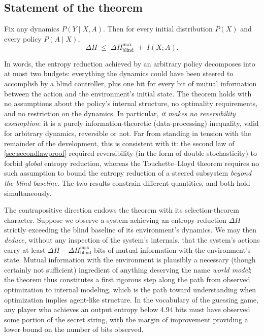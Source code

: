 \documentclass[11pt]{article}
\begin{document}
\subsection{Statement of the theorem}
\label{sec:tlthm}

\begin{theorem}
\label{thm:tl}
Fix any dynamics $P(Y \mid X, A)$. Then for every initial distribution $P(X)$ and every policy $P(A \mid X)$,
\[
\Delta H \;\le\; \Delta H^{\max}_{\mathrm{blind}} \;+\; I(X; A).
\]
\end{theorem}

In words, the entropy reduction achieved by an arbitrary policy decomposes into at most two budgets: everything the dynamics could have been steered to accomplish by a blind controller, plus one bit for every bit of mutual information between the action and the environment's initial state. The theorem holds with no assumptions about the policy's internal structure, no optimality requirements, and no restriction on the dynamics. In particular, \emph{it makes no reversibility assumption}: it is a purely information-theoretic (data-processing) inequality, valid for arbitrary dynamics, reversible or not. Far from standing in tension with the remainder of the development, this is consistent with it: the second law of \cref{sec:secondlawproof} required reversibility (in the form of double stochasticity) to forbid \emph{global} entropy reduction, whereas the Touchette--Lloyd theorem requires no such assumption to bound the entropy reduction of a steered subsystem \emph{beyond the blind baseline}. The two results constrain different quantities, and both hold simultaneously.

The contrapositive direction endows the theorem with its selection-theorem character. Suppose we observe a system achieving an entropy reduction $\Delta H$ strictly exceeding the blind baseline of its environment's dynamics. We may then \emph{deduce}, without any inspection of the system's internals, that the system's actions carry at least $\Delta H - \Delta H^{\max}_{\text{blind}}$ bits of mutual information with the environment's state. Mutual information with the environment is plausibly a necessary (though certainly not sufficient) ingredient of anything deserving the name \emph{world model}; the theorem thus constitutes a first rigorous step along the path from observed optimization to internal modeling, which is the path toward understanding when optimization implies agent-like structure. In the vocabulary of the guessing game, any player who achieves an output entropy below 4.94 bits must have observed some portion of the secret string, with the margin of improvement providing a lower bound on the number of bits observed.
\end{document}

